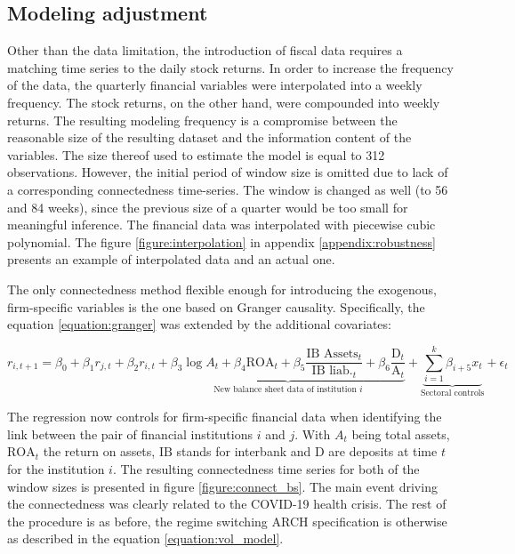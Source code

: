 \documentclass[12pt]{article}
\begin{document}
\subsection{Modeling adjustment}

Other than the data limitation, the introduction of fiscal data requires a matching time series to the daily stock returns. In order to increase the frequency of the data, the quarterly financial variables were interpolated into a weekly frequency. The stock returns, on the other hand, were compounded into weekly returns. The resulting modeling frequency is a compromise between the reasonable size of the resulting dataset and the information content of the variables. The size thereof used to estimate the model is equal to 312 observations. However, the initial period of window size is omitted due to lack of a corresponding connectedness time-series. The window is changed as well (to 56 and 84 weeks), since the previous size of a quarter would be too small for meaningful inference. The financial data was interpolated with piecewise cubic polynomial. The figure \ref{figure:interpolation} in appendix \ref{appendix:robustness} presents an example of interpolated data and an actual one. 

The only connectedness method flexible enough for introducing the exogenous, firm-specific variables is the one based on Granger causality. Specifically, the 
equation \ref{equation:granger} was extended by the additional covariates:

\begin{equation}
	r_{i,t+1} = \beta_0 + \beta_1 r_{j,t} + \beta_2 r_{i, t} + \underbrace{\beta_3 \log{A}_t + \beta_4 \text{ROA}_t + \beta_5 \frac{\text{IB Assets}_t}{\text{IB liab.}_t} + \beta_6 \frac{\text{D}_t}{\text{A}_t}}_{\text{New balance sheet data of institution $i$}} + \underbrace{\sum_{i=1}^{k} \beta_{i+5} x_{t}}_{\text{Sectoral controls}} +\epsilon_t
\end{equation}

The regression now controls for firm-specific financial data when identifying the link between the pair of financial institutions $i$ and $j$. With $A_t$ being total assets, $\text{ROA}_t$ the return on assets, $\text{IB}$ stands for interbank and $\text{D}$ are deposits at time $t$ for the institution $i$. The resulting connectedness time series for both of the window sizes is presented in figure \ref{figure:connect_bs}. The main event driving the connectedness was clearly related to the COVID-19 health crisis. The rest of the procedure is as before, the regime switching ARCH specification is otherwise as described in the equation \ref{equation:vol_model}.
\end{document}
